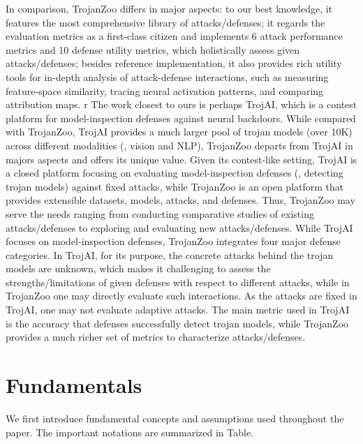 \documentclass[compsoc,conference,a4paper,10pt,times]{IEEEtran}
\newcommand{\system}{{\sc \small TrojanZoo}\xspace}
\begin{document}
In comparison, \system differs in major aspects:  to our best knowledge, it features the most comprehensive library of attacks/defenses;  it regards the evaluation metrics as a first-class citizen and implements 6 attack performance metrics and 10 defense utility metrics, which holistically assess given attacks/defenses;  besides reference implementation, it also provides rich utility tools for in-depth analysis of attack-defense interactions, such as measuring feature-space similarity, tracing neural activation patterns, and comparing attribution maps.
r
The work closest to ours is perhaps {\sc TrojAI}, which is a contest platform for model-inspection defenses against neural backdoors. While compared with \system, {\sc TrojAI} provides a much larger pool of trojan models (over 10K) across different modalities (\meg, vision and NLP), \system departs from {\sc TrojAI} in majors aspects and offers its unique value.  Given its contest-like setting, {\sc TrojAI} is a closed platform focusing on evaluating model-inspection defenses (\mie, detecting trojan models) against fixed attacks, while \system is an open platform that provides extensible datasets, models, attacks, and defenses. Thus, \system may serve the needs ranging from conducting comparative studies of existing attacks/defenses to exploring and evaluating new attacks/defenses.  While {\sc TrojAI} focuses on model-inspection defenses,  \system integrates four major defense categories.  In {\sc TrojAI}, for its purpose, the concrete attacks behind the trojan models are unknown, which makes it challenging to assess the strengths/limitations of given defenses with respect
to different attacks, while in \system one may directly evaluate such interactions.  As the attacks are fixed in {\sc TrojAI}, one may not evaluate adaptive attacks.  The main metric used in {\sc TrojAI} is the accuracy that defenses successfully detect trojan models, while \system provides a much richer set of metrics to characterize attacks/defenses.


\section{Fundamentals}
\label{sec:background}



We first introduce fundamental concepts and assumptions used throughout the paper.
The important notations are summarized in Table.
\end{document}
